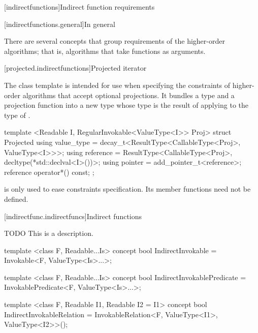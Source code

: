 
\begin{addedblock}

[indirectfunctions]{Indirect function requirements}

[indirectfunctions.general]{In general}

\pnum
There are several concepts that group requirements of the higher-order algorithms; that is,
algorithms that take functions as arguments.


[projected.indirectfunctions]{Projected iterator}

\pnum
The  class template is intended for use when specifying the constraints of
higher-order algorithms that accept optional projections. It bundles a  type
 and a projection function  into a new  type whose
 type is the result of applying  to the  type
of .

\begin{codeblock}
  template <Readable I, RegularInvokable<ValueType<I>> Proj>
  struct Projected {
    using value_type = decay_t<ResultType<CallableType<Proj>, ValueType<I>>>;
    using reference = ResultType<CallableType<Proj>, decltype(*std::declval<I>())>;
    using pointer = add_pointer_t<reference>;
    reference operator*() const;
  };
\end{codeblock}

\pnum
\enternote {} is only used to ease constraints specification. Its
member functions need not be defined.\exitnote

[indirectfunc.indirectfuncs]{Indirect functions}

\pnum
TODO This is a description.

\begin{codeblock}
  template <class F, Readable...Is>
  concept bool IndirectInvokable =
    Invokable<F, ValueType<Is>...>;

  template <class F, Readable...Is>
  concept bool IndirectInvokablePredicate =
    InvokablePredicate<F, ValueType<Is>...>;

  template <class F, Readable I1, Readable I2 = I1>
  concept bool IndirectInvokableRelation =
    InvokableRelation<F, ValueType<I1>, ValueType<I2>>();


\end{codeblock}
\end{addedblock}
